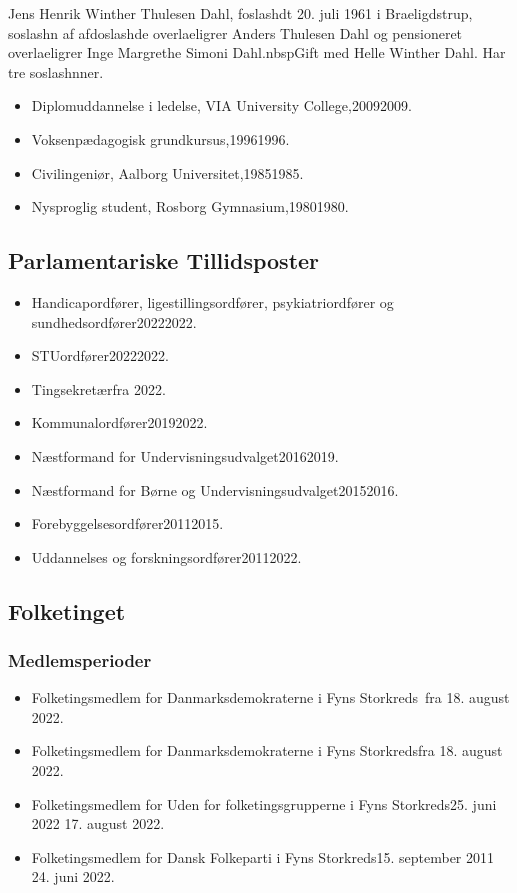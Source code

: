 \documentclass[11pt, a4paper]{awesome-cv}
\begin{document}
\makecvheader[R]
\makelettertitle
\begin{cvletter}
Jens Henrik Winther Thulesen Dahl, foslashdt 20. juli 1961 i Braeligdstrup, soslashn af afdoslashde overlaeligrer Anders Thulesen Dahl og pensioneret overlaeligrer Inge Margrethe Simoni Dahl.nbspGift med Helle Winther Dahl. Har tre soslashnner.

\begin{itemize}
\item Diplomuddannelse i ledelse, VIA University College,20092009.
\item Voksenpædagogisk grundkursus,19961996.
\item Civilingeniør, Aalborg Universitet,19851985.
\item Nysproglig student, Rosborg Gymnasium,19801980.
\end{itemize}
\subsection*{Parlamentariske Tillidsposter}
\begin{itemize}
\item Handicapordfører, ligestillingsordfører, psykiatriordfører og sundhedsordfører20222022.
\item STUordfører20222022.
\item Tingsekretærfra 2022.
\item Kommunalordfører20192022.
\item Næstformand for Undervisningsudvalget20162019.
\item Næstformand for Børne og Undervisningsudvalget20152016.
\item Forebyggelsesordfører20112015.
\item Uddannelses og forskningsordfører20112022.
\end{itemize}
\subsection*{Folketinget}
\subsubsection*{Medlemsperioder}
\begin{itemize}
\item Folketingsmedlem for Danmarksdemokraterne i Fyns Storkreds fra 18. august 2022.
\item Folketingsmedlem for Danmarksdemokraterne i Fyns Storkredsfra 18. august 2022.
\item Folketingsmedlem for Uden for folketingsgrupperne i Fyns Storkreds25. juni 2022  17. august 2022.
\item Folketingsmedlem for Dansk Folkeparti i Fyns Storkreds15. september 2011  24. juni 2022.
\end{itemize}

\end{cvletter}
\end{document}

